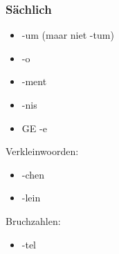 \documentclass[main.tex]{subfiles}
\begin{document}
\begin{minipage}[t]{0,34\textwidth}
 \subsubsection{Sächlich}
 \begin{itemize}
 \item -um (maar niet -tum)
 \item -o
 \item -ment
 \item -nis
 \item GE -e
 \end{itemize}
 Verkleinwoorden:
 \begin{itemize}
 \item -chen
 \item -lein
 \end{itemize}
 Bruchzahlen:
 \begin{itemize}
 \item -tel
 \end{itemize}
\end{minipage}
\end{document}

